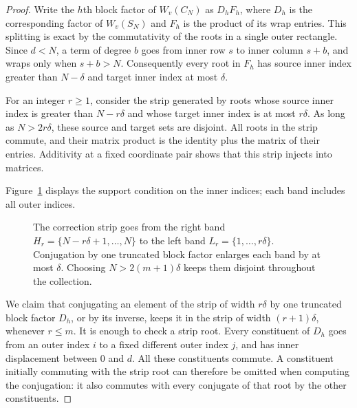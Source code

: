 \begin{proof}
Write the $h$th block factor of $W_v(C_N)$ as $D_h F_h$, where
$D_h$ is the corresponding factor of $W_v(S_N)$ and $F_h$ is
the product of its wrap entries.  This splitting is exact by the
commutativity of the roots in a single outer rectangle.  Since
$d<N$, a term of degree $b$ goes from inner row $s$ to inner column
$s+b$, and wraps only when $s+b>N$.  Consequently every root in
$F_h$ has source inner index greater than $N-\delta$ and target
inner index at most $\delta$.

For an integer $r\geq 1$, consider the strip generated by roots
whose source inner index is greater than $N-r\delta$ and whose
target inner index is at most $r\delta$.  As long as
$N>2r\delta$, these source and target sets are disjoint.  All roots
in the strip commute, and their matrix product is the identity
plus the matrix of their entries.  Additivity at a fixed coordinate
pair shows that this strip injects into matrices.

Figure~\ref{kt:strip-figure} displays the support condition on the
inner indices; each band includes all outer indices.
\begin{figure}[htbp]
\centering
{}
\caption{The correction strip goes from the right band
$H_r=\{N-r\delta+1,\ldots,N\}$ to the left band
$L_r=\{1,\ldots,r\delta\}$. Conjugation by one truncated block factor
enlarges each band by at most $\delta$.  Choosing
$N>2(m+1)\delta$ keeps them disjoint throughout the collection.}
\label{kt:strip-figure}
\end{figure}

We claim that conjugating an element of the strip of width
$r\delta$ by one truncated block factor $D_h$, or by its inverse,
keeps it in the strip of width $(r+1)\delta$, whenever $r\leq m$.
It is enough to check a strip root.  Every constituent of $D_h$
goes from an outer index $i$ to a fixed different outer index $j$,
and has inner displacement between $0$ and $d$.  All these
constituents commute.  A constituent initially commuting with the
strip root can therefore be omitted when computing the conjugation:
it also commutes with every conjugate of that root by the other
constituents.


\end{proof}
